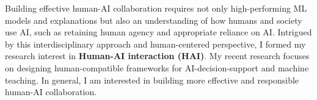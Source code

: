 




Building effective human-AI collaboration requires not only high-performing ML models and explanations but also an understanding of how humans and society use AI, such as retaining human agency and appropriate reliance on AI. Intrigued by this interdisciplinary approach and human-centered perspective, I formed my research interest in \textbf{Human-AI interaction (HAI)}.
My recent research focuses on designing human-compatible frameworks for AI-decision-support and machine teaching.
In general, I am interested in building more effective and responsible human-AI collaboration.






